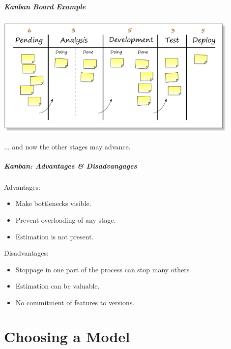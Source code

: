 \begin{frame}
\frametitle{Kanban Board Example}
\begin{center}
\includegraphics[width=0.9\textwidth]{images/kanban-board-3.png}
\end{center}
... and now the other stages may advance.
\end{frame}

\begin{frame}
\frametitle{Kanban: Advantages \& Disadvangages}
\begin{changemargin}{1cm}

Advantages:
\begin{itemize}
	\item Make bottlenecks visible.
	\item Prevent overloading of any stage.
	\item Estimation is not present. 
\end{itemize}

Disadvantages:
\begin{itemize}
	\item Stoppage in one part of the process can stop many others 
	\item Estimation can be valuable.
	\item No commitment of features to versions.
\end{itemize}

\end{changemargin}
\end{frame}

\part{Choosing a Model}

\begin{frame}
\partpage
\end{frame}



